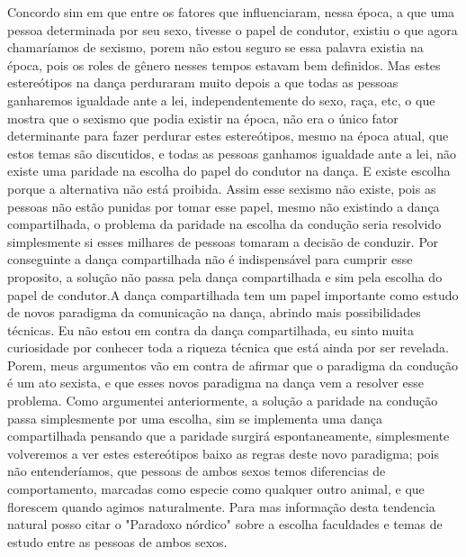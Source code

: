 \documentclass[a4paper,10pt]{article}
\begin{document}
Concordo sim em que entre os fatores que influenciaram, nessa época, a que uma pessoa determinada por seu sexo, tivesse o papel de condutor, existiu o que agora chamaríamos de sexismo, porem não estou seguro se essa palavra existia na época, pois os roles de gênero nesses tempos estavam bem definidos. Mas estes estereótipos na dança perduraram muito depois a que todas as pessoas ganharemos igualdade ante a lei, independentemente do sexo, raça, etc, o que mostra que o sexismo que podia existir na época, não era o único fator determinante para fazer perdurar estes estereótipos, mesmo na época atual, que estos temas são discutidos, e todas as pessoas ganhamos igualdade ante a lei, não existe uma paridade na escolha do papel do condutor na dança. E existe escolha porque a alternativa não está proibida. Assim esse sexismo não existe, pois as pessoas não estão punidas por tomar esse papel, mesmo não existindo a dança compartilhada, o problema da paridade na escolha da condução seria resolvido simplesmente si esses milhares de pessoas tomaram a decisão de conduzir. Por conseguinte a dança compartilhada não é indispensável para cumprir esse proposito, a solução não passa pela dança compartilhada e sim pela escolha do papel de condutor.A dança compartilhada tem um papel importante como estudo de novos paradigma da comunicação na dança, abrindo mais possibilidades técnicas. Eu não estou em contra da dança compartilhada, eu sinto muita curiosidade por conhecer toda a riqueza técnica que está ainda por ser revelada. Porem, meus argumentos vão em contra de afirmar que o paradigma da condução é um ato sexista, e que esses novos paradigma na dança vem a resolver esse problema. Como argumentei anteriormente, a solução a paridade na condução passa simplesmente por uma escolha, sim se implementa uma dança compartilhada pensando que a paridade surgirá espontaneamente, simplesmente volveremos a ver estes estereótipos baixo as regras deste novo paradigma; pois não entenderíamos, que pessoas de ambos sexos temos diferencias de comportamento, marcadas como especie como qualquer outro animal, e que florescem quando agimos naturalmente. Para mas informação desta tendencia natural posso citar o "Paradoxo nórdico" sobre a escolha faculdades e temas de estudo entre as pessoas de ambos sexos.﻿
\end{document}
